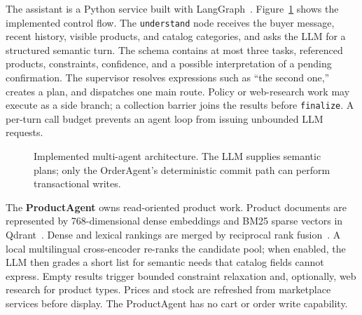 \documentclass{IEEEtran}
\newcommand{\code}[1]{\texttt{\small #1}}
\begin{document}
The assistant is a Python service built with LangGraph~\cite{langgraph}. Figure~\ref{fig:architecture} shows the implemented control flow. The \code{understand} node receives the buyer message, recent history, visible products, and catalog categories, and asks the LLM for a structured semantic turn. The schema contains at most three tasks, referenced products, constraints, confidence, and a possible interpretation of a pending confirmation. The supervisor resolves expressions such as ``the second one,'' creates a plan, and dispatches one main route. Policy or web-research work may execute as a side branch; a collection barrier joins the results before \code{finalize}. A per-turn call budget prevents an agent loop from issuing unbounded LLM requests.

\begin{figure}[t]
\centering
{}
\caption{Implemented multi-agent architecture. The LLM supplies semantic plans; only the OrderAgent's deterministic commit path can perform transactional writes.}
\label{fig:architecture}
\end{figure}

The \textbf{ProductAgent} owns read-oriented product work. Product documents are represented by 768-dimensional dense embeddings and BM25 sparse vectors in Qdrant~\cite{qdrant,lee2025geminiembedding,robertson2009bm25}. Dense and lexical rankings are merged by reciprocal rank fusion~\cite{cormack2009rrf}. A local multilingual cross-encoder re-ranks the candidate pool; when enabled, the LLM then grades a short list for semantic needs that catalog fields cannot express. Empty results trigger bounded constraint relaxation and, optionally, web research for product types. Prices and stock are refreshed from marketplace services before display. The ProductAgent has no cart or order write capability.
\end{document}
